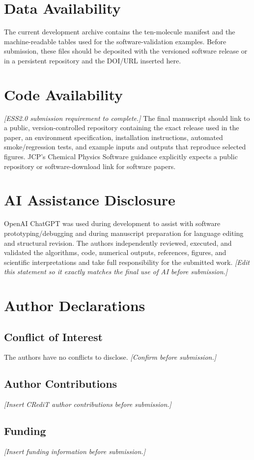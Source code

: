 \documentclass[aip,jcp,reprint,amsmath,amssymb,floatfix]{revtex4-2}
\begin{document}
\section*{Data Availability}
The current development archive contains the ten-molecule manifest and the machine-readable tables used for the software-validation examples. Before submission, these files should be deposited with the versioned software release or in a persistent repository and the DOI/URL inserted here.

\section*{Code Availability}
\textit{[ESS2.0 submission requirement to complete.]} The final manuscript should link to a public, version-controlled repository containing the exact release used in the paper, an environment specification, installation instructions, automated smoke/regression tests, and example inputs and outputs that reproduce selected figures. JCP's Chemical Physics Software guidance explicitly expects a public repository or software-download link for software papers.\cite{Sherrill2021Software}

\section*{AI Assistance Disclosure}
OpenAI ChatGPT was used during development to assist with software prototyping/debugging and during manuscript preparation for language editing and structural revision. The authors independently reviewed, executed, and validated the algorithms, code, numerical outputs, references, figures, and scientific interpretations and take full responsibility for the submitted work. \textit{[Edit this statement so it exactly matches the final use of AI before submission.]}

\section*{Author Declarations}
\subsection*{Conflict of Interest}
The authors have no conflicts to disclose. \textit{[Confirm before submission.]}

\subsection*{Author Contributions}
\textit{[Insert CRediT author contributions before submission.]}

\subsection*{Funding}
\textit{[Insert funding information before submission.]}


\end{document}
